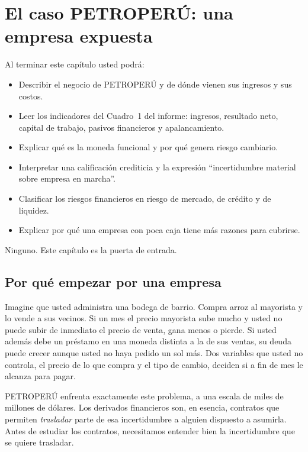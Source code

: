 \chapter{El caso PETROPERÚ: una empresa expuesta}\label{cap:caso}

\begin{objetivos}
Al terminar este capítulo usted podrá:
\begin{itemize}
\item Describir el negocio de PETROPERÚ y de dónde vienen sus ingresos y sus costos.
\item Leer los indicadores del Cuadro~1 del informe: ingresos, resultado neto, capital de trabajo, pasivos financieros y apalancamiento.
\item Explicar qué es la moneda funcional y por qué genera riesgo cambiario.
\item Interpretar una calificación crediticia y la expresión \enquote{incertidumbre material sobre empresa en marcha}.
\item Clasificar los riesgos financieros en riesgo de mercado, de crédito y de liquidez.
\item Explicar por qué una empresa con poca caja tiene más razones para cubrirse.
\end{itemize}
\end{objetivos}

\begin{prerreq}Ninguno. Este capítulo es la puerta de entrada.\end{prerreq}

\section{Por qué empezar por una empresa}

Imagine que usted administra una bodega de barrio. Compra arroz al mayorista y lo vende a sus vecinos. Si un mes el precio mayorista sube mucho y usted no puede subir de inmediato el precio de venta, gana menos o pierde. Si usted además debe un préstamo en una moneda distinta a la de sus ventas, su deuda puede crecer aunque usted no haya pedido un sol más. Dos variables que usted no controla, el precio de lo que compra y el tipo de cambio, deciden si a fin de mes le alcanza para pagar.

PETROPERÚ enfrenta exactamente este problema, a una escala de miles de millones de dólares. Los derivados financieros son, en esencia, contratos que permiten \emph{trasladar} parte de esa incertidumbre a alguien dispuesto a asumirla. Antes de estudiar los contratos, necesitamos entender bien la incertidumbre que se quiere trasladar.

